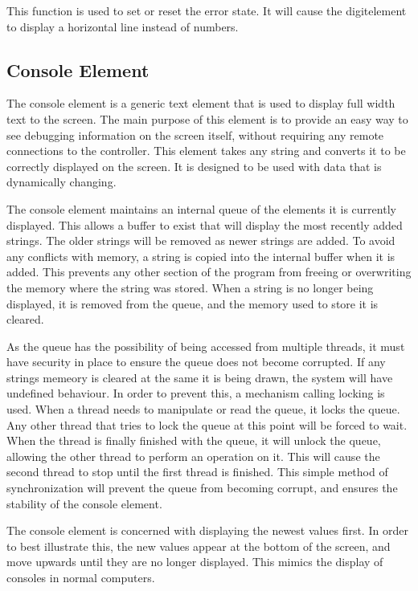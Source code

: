 This function is used to set or reset the error state. It will cause the digitelement to display a horizontal line instead of numbers. 

\subsection{Console Element}
\label{sec:consoleelement}

The console element is a generic text element that is used to display full width text to the screen. The main purpose of this element is to provide an easy way to see debugging information on the screen itself, without requiring any remote connections to the controller. This element takes any string and converts it to be correctly displayed on the screen. It is designed to be used with data that is dynamically changing.

The console element maintains an internal queue of the elements it is currently displayed. This allows a buffer to exist that will display the most recently added strings. The older strings will be removed as newer strings are added. To avoid any conflicts with memory, a string is copied into the internal buffer when it is added. This prevents any other section of the program from freeing or overwriting the memory where the string was stored. When a string is no longer being displayed, it is removed from the queue, and the memory used to store it is cleared.

As the queue has the possibility of being accessed from multiple threads, it must have security in place to ensure the queue does not become corrupted. If any strings memeory is cleared at the same it is being drawn, the system will have undefined behaviour. In order to prevent this, a mechanism calling locking is used. When a thread needs to manipulate or read the queue, it locks the queue. Any other thread that tries to lock the queue at this point will be forced to wait. When the thread is finally finished with the queue, it will unlock the queue, allowing the other thread to perform an operation on it. This will cause the second thread to stop until the first thread is finished. This simple method of synchronization will prevent the queue from becoming corrupt, and ensures the stability of the console element.

The console element is concerned with displaying the newest values first. In order to best illustrate this, the new values appear at the bottom of the screen, and move upwards until they are no longer displayed. This mimics the display of consoles in normal computers. 

